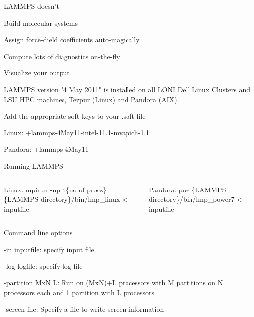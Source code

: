 \documentclass[slidestop,mathserif,compress,xcolor=svgnames]{beamer}
\begin{document}
\begin{frame}[allowframebreaks]
\begin{itemize}
{\footnotesize
\item LAMMPS doesn't
\begin{enumerate}
{\footnotesize
\item Build molecular systems
\item Assign force-dield coefficients auto-magically
\item Compute lots of diagnostics on-the-fly
\item Visualize your output
}
\end{enumerate}
\item LAMMPS version "4 May 2011" is installed on all LONI Dell Linux Clusters and LSU HPC machines, Tezpur (Linux) and Pandora (AIX).
\item Add the appropriate soft keys to your .soft file
\begin{enumerate}
{\footnotesize
\item Linux: +lammps-4May11-intel-11.1-mvapich-1.1
\item Pandora: +lammps-4May11
}
\end{enumerate}
\item Running LAMMPS
\begin{enumerate}
\begin{columns}
\column{11cm}
\vspace{-0.5cm}
{\footnotesize
\item[$\vardiamond$] Linux: mpirun -np \$\{no of procs\} \{LAMMPS directory\}/bin/lmp\_linux < inputfile
\item[$\vardiamond$] Pandora: poe \{LAMMPS directory\}/bin/lmp\_power7 < inputfile
}
\end{columns}
\end{enumerate}
\item Command line options
\begin{itemize}
{\footnotesize
\item[$\vardiamond$] -in inputfile: specify input file
\item[$\vardiamond$] -log logfile: specify log file
\item[$\vardiamond$] -partition MxN L: Run on (MxN)+L processors with M partitions on N processors each and 1 partition with L processors
\item[$\vardiamond$] -screen file: Specify a file to write screen information
}
\end{itemize}
}
\end{itemize}
\end{frame}
\end{document}
